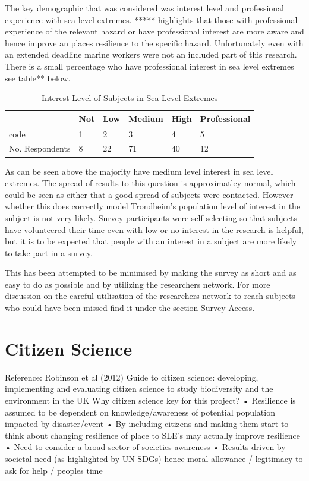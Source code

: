 The key demographic that was considered was interest level and professional experience with sea level extremes. ***** highlights that those with professional experience of the relevant hazard or have professional interest are more aware and hence improve an places resilience to the specific hazard. Unfortunately even with an extended deadline marine workers were not an included part of this research. There is a small percentage who have professional interest in sea level extremes see table** below. 

\begin{table}[!ht]
    \centering
    \begin{tabular}{|l|l|l|l|l|l|}
    \hline
       & Not & Low & Medium & High & Professional \\ \hline
       code & 1 & 2 & 3 & 4 & 5 \\ \hline
        No. Respondents & 8 & 22 & 71 & 40 & 12 \\ \hline
    \end{tabular}
    \caption{Interest Level of Subjects in Sea Level Extremes}
    \label{interest_level_table}
\end{table}

As can be seen above the majority have medium level interest in sea level extremes. The spread of results to this question is approximatley normal, which could be seen as either that a good spread of subjects were contacted. However whether this does correctly model Trondheim's population level of interest in the subject is not very likely.  Survey participants were self selecting so that subjects have volunteered their time even with low or no interest in the research is helpful, but it is to be expected that people with an interest in a subject are more likely to take part in a survey.

This has been attempted to be minimised by making the survey as short and as easy to do as possible and by utilizing the researchers network. For more discussion on the careful utilisation of the researchers network to reach subjects who could have been missed find it under the section Survey Access. 

\section{Citizen Science}
Reference: Robinson et al (2012) Guide to citizen science: developing, implementing and evaluating citizen science to study biodiversity and the environment in the UK 
Why citizen science key for this project?
•	Resilience is assumed to be dependent on knowledge/awareness of potential population impacted by disaster/event
•	By including citizens and making them start to think about changing resilience of place to SLE’s may actually improve resilience
•	Need to consider a broad sector of societies awareness
•	Results driven by societal need (as highlighted by UN SDGs) hence moral allowance / legitimacy to ask for help / peoples time


